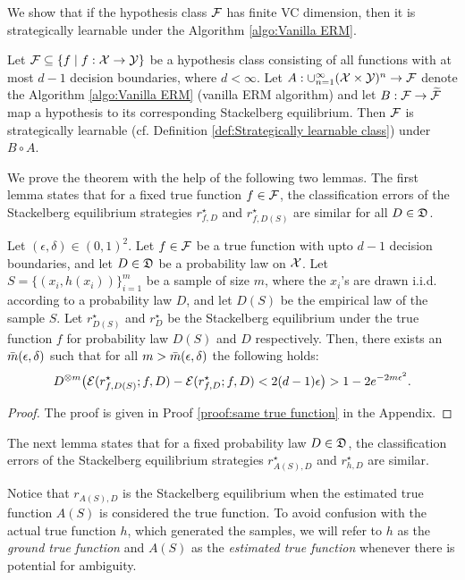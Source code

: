 We show that if the hypothesis class $\mathcal{F}$ has finite VC dimension, then it is strategically learnable under the Algorithm \ref{algo:Vanilla ERM}.

\begin{thm}\label{thm:Startegic learning for vanilla ERM}
Let $\mathcal{F} \subseteq \{ f \mid f: \mathcal{X} \rightarrow \mathcal{Y} \}$ be a hypothesis class consisting of all functions with at most $d-1$ decision boundaries, where $d <\infty$. Let $A: \cup_{n=1}^\infty (\mathcal{X} \times \mathcal{Y})^n \rightarrow \mathcal{F}$ denote the Algorithm \ref{algo:Vanilla ERM} (vanilla ERM algorithm) and let $B: \mathcal{F} \rightarrow \widetilde{\mathcal{F}}$ map a hypothesis to its corresponding Stackelberg equilibrium. Then $\mathcal{F}$ is strategically learnable (cf. Definition \ref{def:Strategically learnable class}) under $B \circ A$.
\end{thm}

We prove the theorem with the help of the following two lemmas. The first lemma states that for a fixed true function $f \in \mathcal{F}$, the classification errors of the Stackelberg equilibrium strategies $r^\star_{f,D}$ and $r^\star_{f,D(S)}$ are similar for all $D \in \mathfrak{D}$.

\begin{lem}\label{lem:same true function}
Let $(\epsilon, \delta) \in (0,1)^2$. Let $f \in \mathcal{F}$ be a true function with upto $d-1$ decision boundaries, and let $D \in \mathfrak{D}$ be a probability law on $\mathcal{X}$. Let $S = \{(x_i, h(x_i))\}_{i=1}^m$ be a sample of size $m$, where the $x_i$'s are drawn i.i.d. according to a probability law $D$, and let $D(S)$ be the empirical law of the sample $S$. Let $r^{\star}_{D(S)}$ and $r^{\star}_{D}$ be the Stackelberg equilibrium under the true function $f$ for probability law $D(S)$ and $D$ respectively. Then, there exists an $\bar{m}(\epsilon,\delta)$ such that for all $m > \bar{m}(\epsilon,\delta)$ the following holds:
    \begin{equation*}
        D^{\otimes m}\big(\mathcal{E}(r^\star_{f,D(S)};f, D) - \mathcal{E}(r^\star_{f,D};f, D) < 2(d-1)\epsilon\big) > 1 - 2e^{-2m\epsilon^2}.
    \end{equation*}
\end{lem}

\begin{proof} The proof is given in Proof \ref{proof:same true function} in the Appendix.
\end{proof}

The next lemma states that for a fixed probability law $D \in \mathfrak{D}$, the classification errors of the Stackelberg equilibrium strategies $r^\star_{A(S),D}$ and $r^\star_{h,D}$ are similar. 
\begin{rem}
Notice that $r_{A(S),D}$ is the Stackelberg equilibrium when the estimated true function $A(S)$ is considered the true function. To avoid confusion with the actual true function $h$, which generated the samples, we will refer to $h$ as the \textit{ground true function} and $A(S)$ as the \textit{estimated true function} whenever there is potential for ambiguity.
\end{rem}

